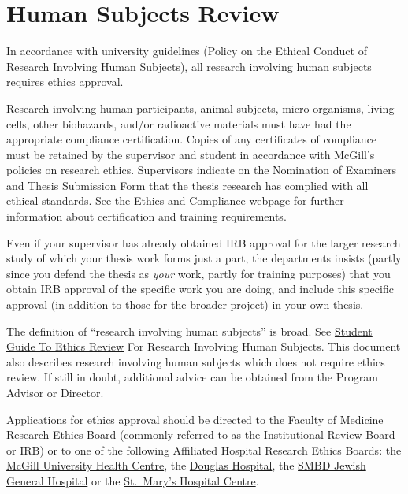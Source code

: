 \documentclass[
  letterpaper,
  DIV=11,
  numbers=noendperiod]{scrreprt}
\begin{document}
\section{Human Subjects Review}\label{human-subjects-review}

In accordance with university guidelines (Policy on the Ethical Conduct
of Research Involving Human Subjects), all research involving human
subjects requires ethics approval.

Research involving human participants, animal subjects, micro-organisms,
living cells, other biohazards, and/or radioactive materials must have
had the appropriate compliance certification. Copies of any certificates
of compliance must be retained by the supervisor and student in
accordance with McGill's policies on research ethics. Supervisors
indicate on the Nomination of Examiners and Thesis Submission Form that
the thesis research has complied with all ethical standards. See the
Ethics and Compliance webpage for further information about
certification and training requirements.

Even if your supervisor has already obtained IRB approval for the larger
research study of which your thesis work forms just a part, the
departments insists (partly since you defend the thesis as \emph{your}
work, partly for training purposes) that you obtain IRB approval of the
specific work you are doing, and include this specific approval (in
addition to those for the broader project) in your own thesis.

The definition of ``research involving human subjects'' is broad. See
\href{https://www.mcgill.ca/research/researchers/compliance/human}{Student
Guide To Ethics Review} For Research Involving Human Subjects. This
document also describes research involving human subjects which does not
require ethics review. If still in doubt, additional advice can be
obtained from the Program Advisor or Director.

Applications for ethics approval should be directed to the
\href{https://www.mcgill.ca/medresearch/ethics}{Faculty of Medicine
Research Ethics Board} (commonly referred to as the Institutional Review
Board or IRB) or to one of the following Affiliated Hospital Research
Ethics Boards: the
\href{https://muhc.ca/cae/page/research-ethics}{McGill University Health
Centre}, the \href{http://www.douglas.qc.ca/page/ethics}{Douglas
Hospital}, the \href{http://www.jgh.ca/en/ResearchEthicsCommittee}{SMBD
Jewish General Hospital} or the
\href{http://www.stmarysresearch.ca/en/research_review/research-review}{St.~Mary's
Hospital Centre}.
\end{document}
